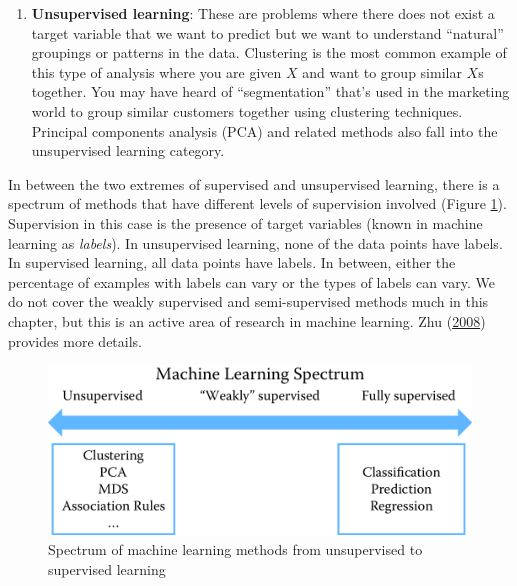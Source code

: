 \documentclass[]{krantz}
\begin{document}
\begin{enumerate}
  One key distinction in machine learning is that the goal is not just
  to find the best function \(F\) that can estimate or predict \(Y\) for
  observed outcomes (known \(Y\)s) but to find one that best generalizes
  to new, unseen data, often in the future. This distinction makes
  methods more focused on generalization and less on just fitting the
  data we have as best as we can. It is important to note that you do
  that implicitly when performing regression by not adding more and more
  higher-order terms to get better fit statistics. By getting better fit
  statistics, we \emph{overfit} to the data and the performance on new
  (unseen) data often goes down. Methods like the lasso (Tibshirani
  \protect\hyperlink{ref-tibshirani1996regression}{1996}) penalize the
  model for having too many terms by performing what is known as
  \emph{regularization}\footnote{In statistical terms, regularization is
    an attempt to avoid overfitting the model.}.
\item
  \textbf{Unsupervised learning}: These are problems where there does
  not exist a target variable that we want to predict but we want to
  understand ``natural'' groupings or patterns in the data. Clustering
  is the most common example of this type of analysis where you are
  given \(X\) and want to group similar \(X\)s together. You may have
  heard of ``segmentation'' that's used in the marketing world to group
  similar customers together using clustering techniques. Principal
  components analysis (PCA) and related methods also fall into the
  unsupervised learning category.
\end{enumerate}

In between the two extremes of supervised and unsupervised learning,
there is a spectrum of methods that have different levels of supervision
involved (Figure \ref{fig:spectrum}). Supervision in this case is the
presence of target variables (known in machine learning as
\emph{labels}). In unsupervised learning, none of the data points have
labels. In supervised learning, all data points have labels. In between,
either the percentage of examples with labels can vary or the types of
labels can vary. We do not cover the weakly supervised and
semi-supervised methods much in this chapter, but this is an active area
of research in machine learning. Zhu
(\protect\hyperlink{ref-zhu2005semi}{2008}) provides more details.

\begin{figure}

{\centering \includegraphics[width=0.7\linewidth]{ChapterML/figures/spectrum} 

}

\caption{Spectrum of machine learning methods from unsupervised to supervised learning}\label{fig:spectrum}
\end{figure}
\end{document}
